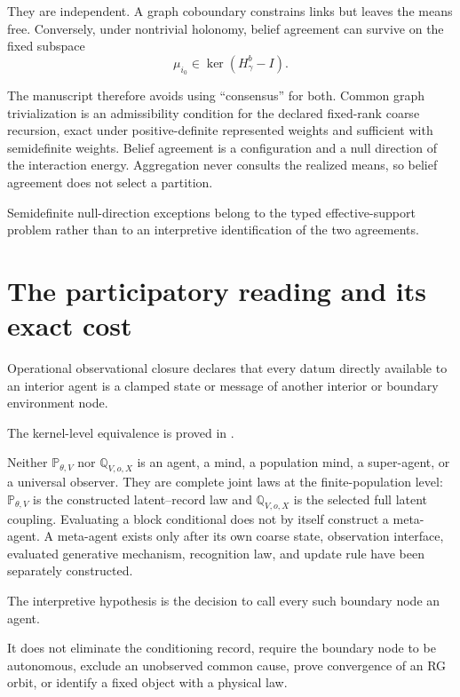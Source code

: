 They are independent. A graph coboundary constrains links but leaves the means
free. Conversely, under nontrivial holonomy, belief agreement can survive on
the fixed subspace
\begin{equation}
\mu_{i_0}\in\ker(H_\gamma^b-I).
\label{eq:phil-agreement-kernel}
\end{equation}

The manuscript therefore avoids using ``consensus'' for both.  Common graph
trivialization is an admissibility condition for the declared fixed-rank
coarse recursion, exact under positive-definite represented weights and
sufficient with semidefinite weights.  Belief agreement is a configuration
and a null direction of the interaction energy.  Aggregation never consults
the realized means, so belief agreement does not select a partition.

Semidefinite null-direction exceptions belong to the typed effective-support
problem rather than to an interpretive identification of the two agreements.

\section{The participatory reading and its exact cost}
\label{sec:phil-participatory}

Operational observational closure declares that every datum directly
available to an interior agent is a clamped state or message of another
interior or boundary environment node. 

The kernel-level equivalence is proved in
. 

Neither \(\mathbb P_{\theta,V}\) nor \(\mathbb Q_{V,o,X}\) is an agent, a
mind, a population mind, a super-agent, or a universal observer.  They are
complete joint laws at the finite-population level: \(\mathbb P_{\theta,V}\)
is the constructed latent--record law and \(\mathbb Q_{V,o,X}\) is the
selected full latent coupling.  Evaluating a block conditional does not by
itself construct a meta-agent.  A meta-agent exists only after its own coarse
state, observation interface, evaluated generative mechanism, recognition
law, and update rule have been separately constructed. 

The interpretive hypothesis is the decision to call every such boundary node
an agent. 

It does not eliminate the conditioning record, require the boundary node to
be autonomous, exclude an unobserved common cause, prove convergence of an RG
orbit, or identify a fixed object with a physical law. 

